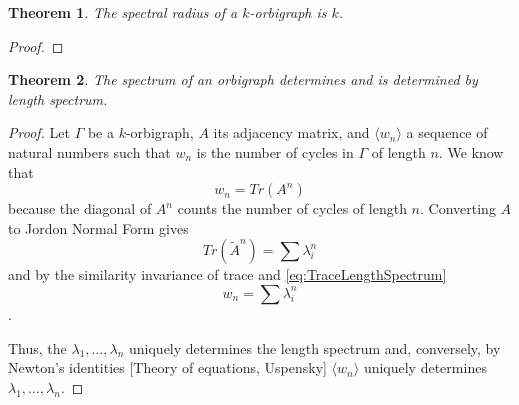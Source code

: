 \documentclass[12pt]{article}
\theoremstyle{plain}
\newtheorem{theorem}{Theorem}
\theoremstyle{definition}
\theoremstyle{remark}
\begin{document}
    \begin{theorem}\label{thm:SpectralRadius}
      The spectral radius of a $k$-orbigraph is $k$.
    \end{theorem}
    \begin{proof}
      
    \end{proof}

    \begin{theorem}\label{thm:LengthSpectrum}
      The spectrum of an orbigraph determines and is determined by length spectrum.
    \end{theorem}
    \begin{proof}
      Let $\Gamma$ be a $k$-orbigraph, $A$ its adjacency matrix, and $\langle w_n \rangle$ a sequence of natural numbers such that $w_n$ is the number of cycles in $\Gamma$ of length $n$. We know that
        \begin{equation}\label{eq:TraceLengthSpectrum}
          w_n = Tr(A^n)
        \end{equation}
      because the diagonal of $A^n$ counts the number of cycles of length $n$. Converting $A$ to Jordon Normal Form gives
      \begin{equation*}
        Tr(\tilde{A}^n) = \sum \lambda_i^n
      \end{equation*}
      and by the similarity invariance of trace and \ref{eq:TraceLengthSpectrum}
      \begin{equation*}
        w_n = \sum \lambda_i^n
      \end{equation*}.

      Thus, the $\lambda_1, \ldots, \lambda_n$ uniquely determines the length spectrum and, conversely, by Newton's identities [Theory of equations, Uspensky] $\langle w_n \rangle$ uniquely determines $\lambda_1, \ldots, \lambda_n$.

    \end{proof}
\end{document}
